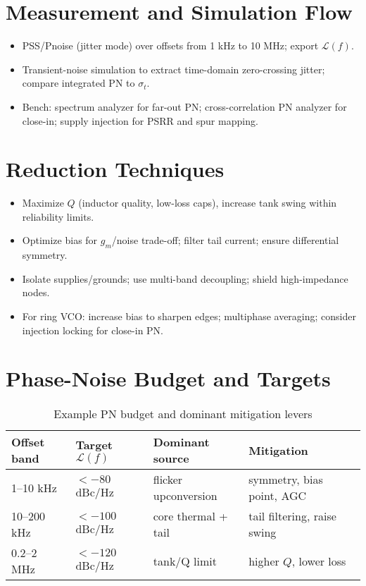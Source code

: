 \section{Measurement and Simulation Flow}
\begin{itemize}
  \item PSS/Pnoise (jitter mode) over offsets from 1 kHz to 10 MHz; export \(\mathcal{L}(f)\).
  \item Transient-noise simulation to extract time-domain zero-crossing jitter; compare integrated PN to \(\sigma_t\).
  \item Bench: spectrum analyzer for far-out PN; cross-correlation PN analyzer for close-in; supply injection for PSRR and spur mapping.
\end{itemize}

\section{Reduction Techniques}
\begin{itemize}
  \item Maximize \(Q\) (inductor quality, low-loss caps), increase tank swing within reliability limits.
  \item Optimize bias for \(g_m\)/noise trade-off; filter tail current; ensure differential symmetry.
  \item Isolate supplies/grounds; use multi-band decoupling; shield high-impedance nodes.
  \item For ring VCO: increase bias to sharpen edges; multiphase averaging; consider injection locking for close-in PN.
\end{itemize}

\section{Phase-Noise Budget and Targets}
\begin{table}[H]
  \centering
  \begin{tabular}{llll}
    \toprule
    Offset band & Target $\mathcal{L}(f)$ & Dominant source & Mitigation \\
    \midrule
    1–10 kHz   & $< -80$ dBc/Hz & flicker upconversion & symmetry, bias point, AGC \\
    10–200 kHz & $< -100$ dBc/Hz & core thermal + tail & tail filtering, raise swing \\
    0.2–2 MHz  & $< -120$ dBc/Hz & tank/Q limit & higher $Q$, lower loss \\
    \bottomrule
  \end{tabular}
  \caption{Example PN budget and dominant mitigation levers}
\end{table}

